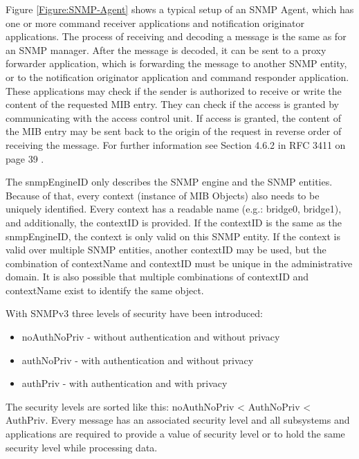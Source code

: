Figure \ref{Figure:SNMP-Agent} shows a typical setup of an SNMP Agent, which has one or more command receiver applications and notification originator applications. The process of receiving and decoding a message is the same as for an SNMP manager. After the message is decoded, it can be sent to a proxy forwarder application, which is forwarding the message to another SNMP entity, or to the notification originator application and command responder application. These applications may check if the sender is authorized to receive or write the content of the requested MIB entry. They can check if the access is granted by communicating with the access control unit. If access is granted, the content of the MIB entry may be sent back to the origin of the request in reverse order of receiving the message. For further information see Section 4.6.2 in RFC 3411 on page 39 \cite{RFC:RFC3411:2002}.

The snmpEngineID only describes the SNMP engine and the SNMP entities. Because of that, every context (instance of MIB Objects) also needs to be uniquely identified. Every context has a readable name (e.g.: bridge0, bridge1), and additionally, the contextID is provided. If the contextID is the same as the snmpEngineID, the context is only valid on this SNMP entity. If the context is valid over multiple SNMP entities, another contextID may be used, but the combination of contextName and contextID must be unique in the administrative domain. It is also possible that multiple combinations of contextID and contextName exist to identify the same object.

With SNMPv3 three levels of security have been introduced:

\begin{minipage}{\textwidth}
\begin{itemize}
    \item noAuthNoPriv - without authentication and without privacy
    \item authNoPriv - with authentication and without privacy
    \item authPriv - with authentication and with privacy
\end{itemize}
\end{minipage}

\newpage
The security levels are sorted like this: noAuthNoPriv < AuthNoPriv < AuthPriv. Every message has an associated security level and all subsystems and applications are required to provide a value of security level or to hold the same security level while processing data.

